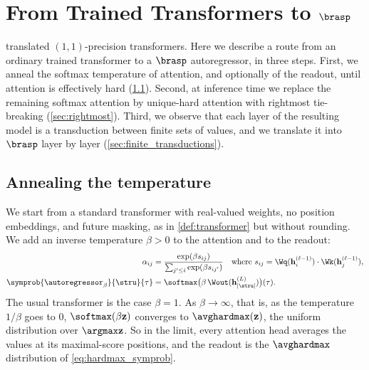
\providecommand{\Vals}{\mathcal{V}}            %
\providecommand{\Sc}{S}                        %
\providecommand{\Outtab}{\delta}               %

\section{From Trained Transformers to \texorpdfstring{$\brasp$}{B-RASP}}
\label{sec:trained_to_brasp}

 translated $(1,1)$-precision transformers. Here we describe a route from
an ordinary trained transformer to a $\brasp$ autoregressor, in three steps.
First, we anneal the softmax temperature of attention, and optionally of the readout, until attention is
effectively hard (\cref{sec:annealing}).
Second, at inference time we replace the remaining softmax attention by unique-hard attention with rightmost tie-breaking (\cref{sec:rightmost}).
Third, we observe that each layer of the resulting model is a transduction between finite sets of
values, and we translate it into $\brasp$ layer by layer (\cref{sec:finite_transductions}).

\subsection{Annealing the temperature}
\label{sec:annealing}

We start from a standard transformer with real-valued weights, no position embeddings, and
future masking, as in \cref{def:transformer} but without rounding.
We add an inverse temperature $\beta>0$ to the attention and to the readout:
\begin{align*}
\alpha_{ij} &= \frac{\exp(\beta s_{ij})}{\sum_{j'\leq i}\exp(\beta s_{ij'})}
\quad\text{where } s_{ij} = \Wq(\mathbf{h}^{(\ell-1)}_i)\cdot\Wk(\mathbf{h}^{(\ell-1)}_j), \\
\symprob{\autoregressor_\beta}{\stru}{\tau} &= \softmax\bigl(\beta\,\Wout(\mathbf{h}^{(L)}_{|\stru|})\bigr)(\tau).
\end{align*}
The usual transformer is the case $\beta=1$.
As $\beta\to\infty$, that is, as the temperature $1/\beta$ goes to $0$,
$\softmax(\beta\mathbf{z})$ converges to $\avghardmax(\mathbf{z})$, the uniform distribution over $\argmax\mathbf{z}$.
So in the limit, every attention head averages the values at its maximal-score positions,
and the readout is the $\avghardmax$ distribution of \cref{eq:hardmax_symprob}.

